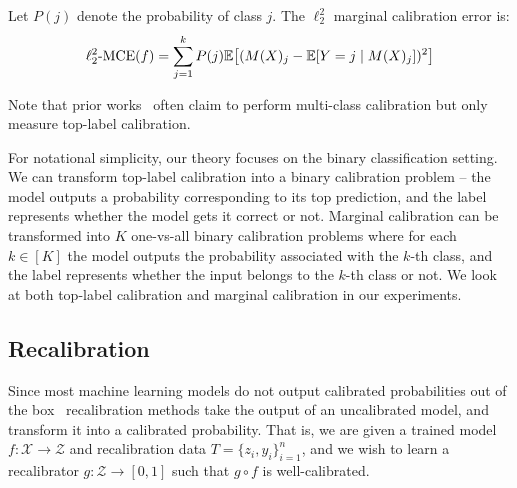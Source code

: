 \begin{definition}
\label{dfn:marginal-ce}
Let $P(j)$ denote the probability of class $j$. The $\ell_2^2$ marginal calibration error is:
\begin{align}
\ell_2^2\mbox{-MCE}(f) = \sum_{j = 1}^k P(j) \mathbb{E}\big[ (M(X)_j - \mathbb{E}[Y = j \mid M(X)_j])^2 \big]
\end{align}
\end{definition}

Note that prior works~\cite{guo2017calibration, hendrycks2019anomaly, hendrycks2019pretraining} often claim to perform multi-class calibration but only measure top-label calibration.


For notational simplicity, our theory focuses on the binary classification setting. We can transform top-label calibration into a binary calibration problem -- the model outputs a probability corresponding to its top prediction, and the label represents whether the model gets it correct or not. Marginal calibration can be transformed into $K$ one-vs-all binary calibration problems where for each $k \in [K]$ the model outputs the probability associated with the $k$-th class, and the label represents whether the input belongs to the $k$-th class or not. We look at both top-label calibration and marginal calibration in our experiments.

\subsection{Recalibration}

Since most machine learning models do not output calibrated probabilities out of the box~\cite{guo2017calibration, zadrozny2001calibrated} recalibration methods take the output of an uncalibrated model, and transform it into a calibrated probability. That is, we are given a trained model $f: \mathcal{X} \to \mathcal{Z}$ and recalibration data $T = \{ z_i, y_i \}_{i=1}^n$, and we wish to learn a recalibrator $g : \mathcal{Z} \to [0, 1]$ such that $g \circ f$ is well-calibrated.

